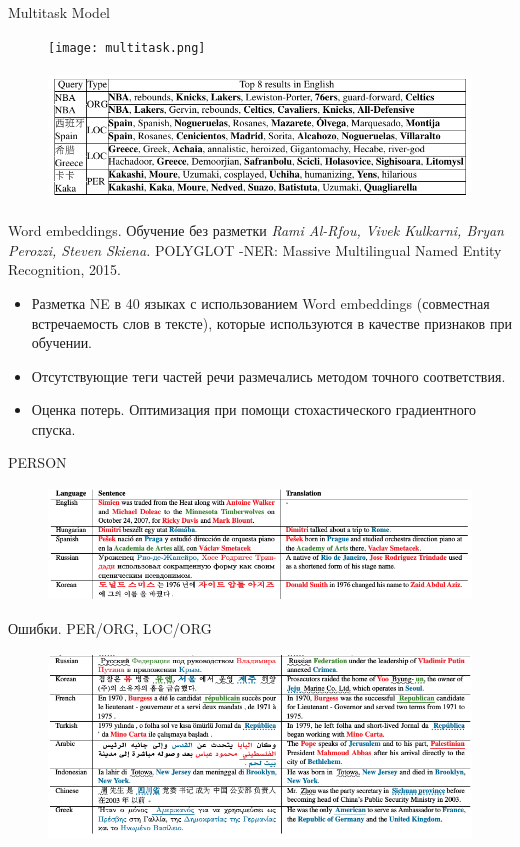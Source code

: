 \documentclass{beamer}
\begin{document}
\begin{frame}{Multitask Model}
\begin{figure}
\texttt{[image: multitask.png]}
\end{figure}
\end{frame}

\begin{frame}
\begin{figure}
\includegraphics[height=3.5cm]{bwes.png}
\end{figure}
\end{frame}
\begin{frame}{Word embeddings. Обучение без разметки}
\textit{Rami Al-Rfou, Vivek Kulkarni, Bryan Perozzi, Steven Skiena.} POLYGLOT -NER: Massive Multilingual Named Entity Recognition, 2015.
\begin{itemize}
\item Разметка NE в 40 языках с использованием Word embeddings (совместная встречаемость слов в тексте), которые используются в качестве признаков при обучении.
\item Отсутствующие теги частей речи размечались методом точного соответствия.  
\item Оценка потерь. Оптимизация при помощи стохастического градиентного спуска. 
\end{itemize}
\end{frame}

\begin{frame}{PERSON}
\begin{figure}
\includegraphics[height=3cm]{ner_em.png}
\end{figure}
\end{frame}

\begin{frame}{Ошибки. PER/ORG, LOC/ORG}
\begin{figure}
\includegraphics[height=5cm]{ner_err.png}
\end{figure}
\end{frame}
\end{document}
